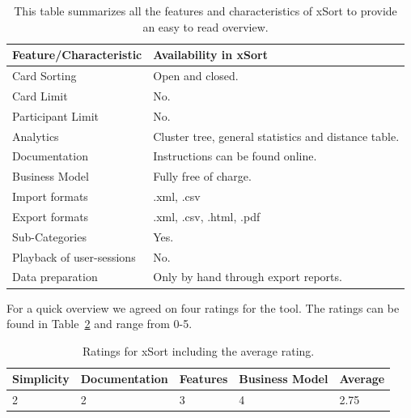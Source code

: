 \begin{table}[tp]
\centering
\begin{tabularx}
{\linewidth}{|l|X|}
\hline \textbf{Feature/Characteristic} & \textbf{Availability in xSort} \\ 
\hline Card Sorting & Open and closed. \\ 
\hline Card Limit & No. \\
\hline Participant Limit & No. \\
\hline Analytics & Cluster tree, general statistics and distance table. \\ 
\hline Documentation & Instructions can be found online. \\
\hline Business Model & Fully free of charge. \\
\hline Import formats & .xml, .csv \\ 
\hline Export formats & .xml, .csv, .html, .pdf \\ 
\hline Sub-Categories & Yes. \\ 
\hline Playback of user-sessions & No. \\ 
\hline Data preparation & Only by hand through export reports. \\ 
\hline
\end{tabularx} 
\caption[Feature summary of xSort] 
{ 
This table summarizes all the features and characteristics of xSort
to provide an easy to read overview.
}
\label{tab:features-xSort}
\end{table}

For a quick overview we agreed on four ratings for the tool. The ratings can be
found in Table~\ref{tab:rating-xSort} and range from 0-5.

\begin{table}[tp] 
\centering 
\begin{tabularx}{\linewidth}{|X|X|X|X|X|}
\hline
Simplicity & Documentation & Features & Business Model & Average \\ 
\hline 
2 & 2 & 3 & 4 & 2.75 \\ 
\hline 
\end{tabularx} 
\caption[Ratings for xSort] {
Ratings for xSort including the average rating.
} 
\label{tab:rating-xSort}
\end{table}